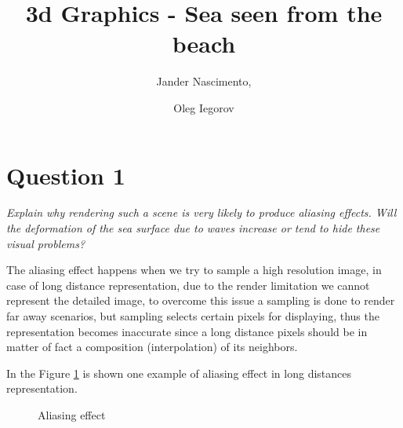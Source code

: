 \documentclass{report}
\begin{document}
\title{3d Graphics - Sea seen from the beach}

\author{Jander Nascimento, 
\and Oleg Iegorov}

\maketitle

\section{Question 1}

\emph{Explain why rendering such a scene is very likely to produce
aliasing effects. Will the deformation of the sea surface due to waves
increase or tend to hide these visual problems?}

The aliasing effect happens when we try to sample a high resolution image\cite{iaow}, in case of long distance representation, due to the render limitation we cannot represent the detailed image, to overcome this issue a sampling is done to render far away scenarios, but sampling selects certain pixels for displaying, thus the representation becomes inaccurate since a long distance pixels should be in matter of fact a composition (interpolation) of its neighbors.

In the Figure \ref{fig:aliasing} is shown one example of aliasing effect in long distances representation.

\begin{figure}[H]
		  \centering
		  \hspace{0.1cm}
		  \caption{Aliasing effect}
		  \label{fig:aliasing}
\end{figure}
\end{document}
